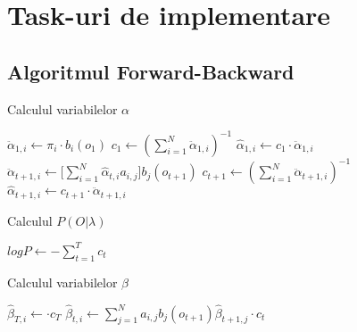 \documentclass[12pt]{article}
\begin{document}
\section{Task-uri de implementare}
\label{sec:tasks}

\subsection{Algoritmul Forward-Backward}
\label{sec:fb}

\begin{algorithm}[H]
  \caption{Calculul variabilelor $\alpha$}
  \label{alg1:alpha}
  \begin{algorithmic}[2]
     \STATE $\ddot{\alpha}_{1,i} \leftarrow
    \pi_i \cdot b_i(o_1)$
    \ENDFOR
    \STATE $c_1 \leftarrow (\displaystyle\sum_{i=1}^{N}
    \ddot{\alpha}_{1,i})^{-1}$  \STATE
    $\hat{\alpha}_{1,i} \leftarrow c_1 \cdot \ddot{\alpha}_{1,i}$
    \ENDFOR
      \STATE
    $\ddot{\alpha}_{t+1,i} \leftarrow \Big[
    \displaystyle\sum_{i=1}^{N}\hat{\alpha}_{t,i}a_{i,j}\Big]
    b_{j}(o_{t+1})$
    \ENDFOR
    \STATE $c_{t+1} \leftarrow (\displaystyle\sum_{i=1}^{N}
    \ddot{\alpha}_{t+1,i})^{-1}$  \STATE
    $\hat{\alpha}_{t+1,i} \leftarrow c_{t+1} \cdot
    \ddot{\alpha}_{t+1,i}$
    \ENDFOR
    \ENDFOR
  \end{algorithmic}
\end{algorithm}

\begin{algorithm}[H]
  \caption{Calculul $P(O \vert \lambda)$}
  \label{alg2:logP}
  \begin{algorithmic}[2]
    \STATE $logP \leftarrow -\displaystyle\sum_{t=1}^{T}c_t$
  \end{algorithmic}
\end{algorithm}

\begin{algorithm}[H]
  \caption{Calculul variabilelor $\beta$}
  \label{alg3:beta}
  \begin{algorithmic}[2]
     \STATE $\hat{\beta}_{T,i} \leftarrow \cdot
    c_T$
    \ENDFOR
      \STATE
    $\hat{\beta}_{t,i} \leftarrow \displaystyle\sum_{j=1}^{N}
    a_{i,j} b_{j}(o_{t+1}) \hat{\beta}_{t+1,j} \cdot c_t$
    \ENDFOR
    \ENDFOR
  \end{algorithmic}
\end{algorithm}
\end{document}
